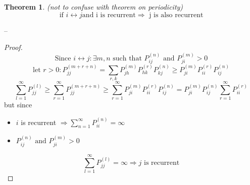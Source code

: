\documentclass[a4paper,12pt]{report}
\newtheorem{theorem}{Theorem}[section]
\newtheorem{corollary}{Corollary}[theorem]
\newtheorem{lemma}[theorem]{Lemma}
\begin{document}
\begin{theorem}
(not to confuse with theorem on periodicity)
$$\mbox{if } i\leftrightarrow j \mbox{and i is recurrent} \Rightarrow \mbox{ j is also recurrent}$$
\end{theorem}
--
\begin{proof}
$$\mbox{Since } i\leftrightarrow j : \exists m,n \mbox{ such that } P_{ij}^{(n)} \mbox{ and } P_{ji}^{(m)} > 0$$
$$\mbox{let } r>0 : P_{jj}^{(m+r+n)} = \sum_{r, k} P_{jh}^{(m)} P_{hk}^{(r)} P_{kj}^{(n)} \geq P_{ji}^{(m)}  P_{ii}^{(r)}  P_{ij}^{(n)}$$
$$\sum_{l=1}^\infty P_{jj}^{(l)} \geq \sum_{r=1}^\infty P_{jj}^{(m+r+n)} \geq \sum_{r=1}^\infty P_{ji}^{(m)}  P_{ii}^{(r)}  P_{ij}^{(n)} = P_{ji}^{(m)} P_{ij}^{(n)} \sum_{r=1}^\infty P_{ii}^{(r)}$$
but since \begin{itemize}
\item$i$ is recurrent $\Rightarrow \sum_{n=1}^\infty P_{ii}^{(n)} = \infty$  
\item $P_{ij}^{(n)} \mbox{ and } P_{ji}^{(m)} > 0$
\end{itemize}
$$\sum_{l=1}^\infty P_{jj}^{(l)} = \infty \Rightarrow j \mbox{ is recurrent}$$

\end{proof}



 
 
 
 
 
 
 
\end{document}
